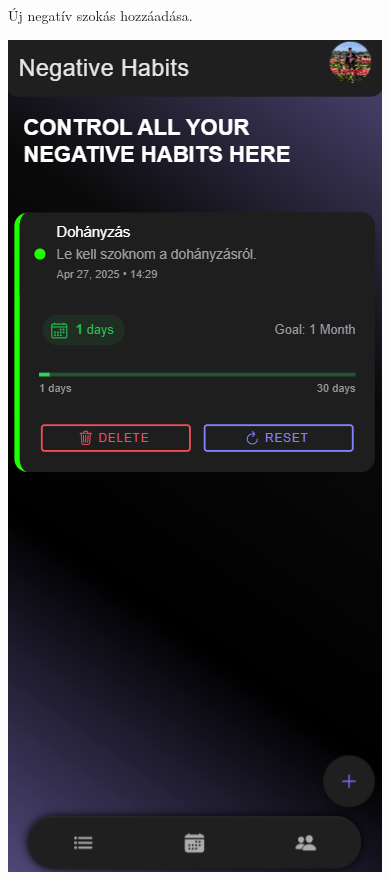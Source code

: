 \documentclass[12pt]{report}
\begin{document}
\begin{figure}[H]
\begin{minipage}[b]{0.2\textwidth}
        \par
        \footnotesize Új negatív szokás hozzáadása.
    \end{minipage}

    \vspace{0.8em}

    \begin{minipage}[b]{0.2\textwidth}
        \centering
        \includegraphics[width=\linewidth]{src/Negativemegjelenes.png}

\end{minipage}
\end{figure}
\end{document}
